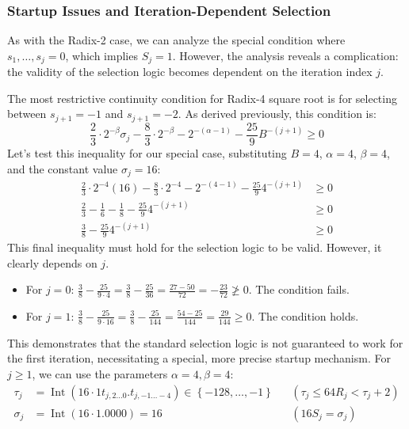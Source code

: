 \documentclass{article}
\DeclareMathOperator{\Int}{Int}
\begin{document}
\subsubsection{Startup Issues and Iteration-Dependent Selection}
\label{sssec:sqrt:radix4_special}
As with the Radix-2 case, we can analyze the special condition where $s_1, \dots, s_j = 0$, which implies $S_j = 1$.
However, the analysis reveals a complication: the validity of the selection logic becomes dependent on the iteration index $j$.

The most restrictive continuity condition for Radix-4 square root is for selecting between $s_{j+1} = -1$ and $s_{j+1} = -2$.
As derived previously, this condition is:
\begin{equation*}
  \frac{2}{3} \cdot 2^{-\beta} \sigma_j - \frac{8}{3} \cdot 2^{-\beta} - 2^{-(\alpha-1)} - \frac{25}{9} B^{-(j+1)} \geq 0
\end{equation*}
Let's test this inequality for our special case, substituting $B = 4$, $\alpha = 4$, $\beta = 4$, and the constant value $\sigma_j = 16$:
\begin{align*}
  \frac{2}{3} \cdot 2^{-4} (16) - \frac{8}{3} \cdot 2^{-4} - 2^{-(4-1)} - \frac{25}{9} 4^{-(j+1)} &\geq 0 \\
  \frac{2}{3} - \frac{1}{6} - \frac{1}{8} - \frac{25}{9} 4^{-(j+1)} &\geq 0 \\
  \frac{3}{8} - \frac{25}{9} 4^{-(j+1)} &\geq 0
\end{align*}
This final inequality must hold for the selection logic to be valid.
However, it clearly depends on $j$.
\begin{itemize}
  \item For $j = 0$: $\frac{3}{8} - \frac{25}{9 \cdot 4} = \frac{3}{8} - \frac{25}{36} = \frac{27 - 50}{72} = -\frac{23}{72} \ngeq 0$. The condition fails.
  \item For $j = 1$: $\frac{3}{8} - \frac{25}{9 \cdot 16} = \frac{3}{8} - \frac{25}{144} = \frac{54 - 25}{144} = \frac{29}{144} \geq 0$. The condition holds.
\end{itemize}
This demonstrates that the standard selection logic is not guaranteed to work for the first iteration, necessitating a special, more precise startup mechanism.
For $j \geq 1$, we can use the parameters $\alpha = 4, \beta = 4$:
\begin{align}
  \label{eq:sqrt:radix4_tau_special}
  \tau_j &= \Int(16 \cdot 1t_{j,2\ldots0}.t_{j,-1\ldots-4}) \in \left\{-128, \dots, -1\right\} && (\tau_j \leq 64 R_j < \tau_j + 2) \\
  \label{eq:sqrt:radix4_sigma_special}
  \sigma_j &= \Int(16 \cdot 1.0000) = 16 && (16 S_j = \sigma_j)
\end{align}
\end{document}
